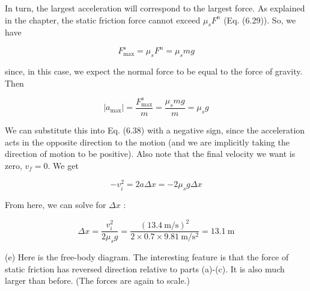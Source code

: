 \documentclass[10pt]{article}
\begin{document}
In turn, the largest acceleration will correspond to the largest force. As explained in the chapter, the static friction force cannot exceed $\mu_{s} F^{n}$ (Eq. (6.29)). So, we have

$$
F_{\max }^{s}=\mu_{s} F^{n}=\mu_{s} m g
$$

since, in this case, we expect the normal force to be equal to the force of gravity. Then

$$
\left|a_{\max }\right|=\frac{F_{\max }^{s}}{m}=\frac{\mu_{s} m g}{m}=\mu_{s} g
$$

We can substitute this into Eq. (6.38) with a negative sign, since the acceleration acts in the opposite direction to the motion (and we are implicitly taking the direction of motion to be positive). Also note that the final velocity we want is zero, $v_{f}=0$. We get

$$
-v_{i}^{2}=2 a \Delta x=-2 \mu_{s} g \Delta x
$$

From here, we can solve for $\Delta x$ :

$$
\Delta x=\frac{v_{i}^{2}}{2 \mu_{s} g}=\frac{(13.4 \mathrm{~m} / \mathrm{s})^{2}}{2 \times 0.7 \times 9.81 \mathrm{~m} / \mathrm{s}^{2}}=13.1 \mathrm{~m}
$$

(e) Here is the free-body diagram. The interesting feature is that the force of static friction has reversed direction relative to parts (a)-(c). It is also much larger than before. (The forces are again to scale.)
\end{document}
